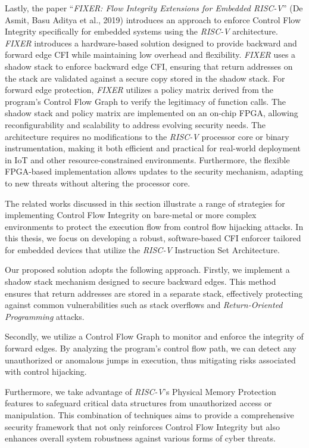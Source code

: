 Lastly, the paper ``\textit{FIXER: Flow Integrity Extensions for Embedded RISC-V}''
(De Asmit, Basu Aditya et al., 2019)\cite{Fixer} introduces an approach to
enforce Control Flow Integrity specifically for embedded systems using the
\textit{RISC-V} architecture. \textit{FIXER} introduces a hardware-based solution
designed to provide backward and forward edge CFI while maintaining low overhead
and flexibility. \textit{FIXER} uses a shadow stack to enforce backward edge CFI,
ensuring that return addresses on the stack are validated against a secure copy
stored in the shadow stack. For forward edge protection, \textit{FIXER} utilizes
a policy matrix derived from the program's Control Flow Graph to verify the legitimacy
of function calls. The shadow stack and policy matrix are implemented on an on-chip
FPGA, allowing reconfigurability and scalability to address evolving security needs.
The architecture requires no modifications to the \textit{RISC-V} processor core
or binary instrumentation, making it both efficient and practical for real-world
deployment in IoT and other resource-constrained environments. Furthermore, the
flexible FPGA-based implementation allows updates to the security mechanism, adapting
to new threats without altering the processor core.

The related works discussed in this section illustrate a range of strategies for
implementing Control Flow Integrity on bare-metal or more complex environments to
protect the execution flow from control flow hijacking attacks. In this thesis, we
focus on developing a robust, software-based CFI enforcer tailored for embedded
devices that utilize the \textit{RISC-V} Instruction Set Architecture.

Our proposed solution adopts the following approach. Firstly, we implement a shadow
stack mechanism designed to secure backward edges. This method ensures that
return addresses are stored in a separate stack, effectively protecting against common
vulnerabilities such as stack overflows and \textit{Return-Oriented Programming}
attacks.

Secondly, we utilize a Control Flow Graph to monitor and enforce the integrity of
forward edges. By analyzing the program's control flow path, we can detect any unauthorized
or anomalous jumps in execution, thus mitigating risks associated with control
hijacking.

Furthermore, we take advantage of \textit{RISC-V}'s Physical Memory Protection
features to safeguard critical data structures from unauthorized access or
manipulation. This combination of techniques aims to provide a comprehensive security
framework that not only reinforces Control Flow Integrity but also enhances overall
system robustness against various forms of cyber threats.
